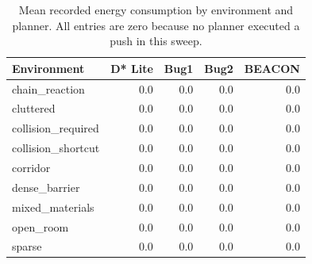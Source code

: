 \begin{table}[t]
\centering
\caption{Mean recorded energy consumption by environment and planner. All entries are zero because no planner executed a push in this sweep.}
\label{tab:energy-comparison-by-env}
\begin{tabular}{lrrrr}
\hline
\textbf{Environment} & \textbf{D* Lite} & \textbf{Bug1} & \textbf{Bug2} & \textbf{BEACON} \\
\hline
chain\_reaction & 0.0 & 0.0 & 0.0 & 0.0 \\
cluttered & 0.0 & 0.0 & 0.0 & 0.0 \\
collision\_required & 0.0 & 0.0 & 0.0 & 0.0 \\
collision\_shortcut & 0.0 & 0.0 & 0.0 & 0.0 \\
corridor & 0.0 & 0.0 & 0.0 & 0.0 \\
dense\_barrier & 0.0 & 0.0 & 0.0 & 0.0 \\
mixed\_materials & 0.0 & 0.0 & 0.0 & 0.0 \\
open\_room & 0.0 & 0.0 & 0.0 & 0.0 \\
sparse & 0.0 & 0.0 & 0.0 & 0.0 \\
\hline
\end{tabular}
\end{table}
